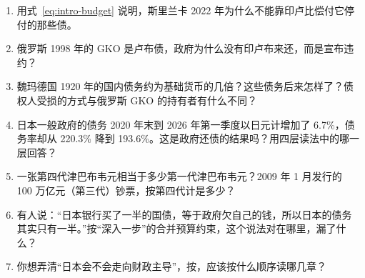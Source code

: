 \begin{selfcheck}
\begin{enumerate}
\item 用式~\eqref{eq:intro-budget} 说明，斯里兰卡 2022 年为什么不能靠印卢比偿付它停付的那些债。
\item 俄罗斯 1998 年的 GKO 是卢布债，政府为什么没有印卢布来还，而是宣布违约？
\item 魏玛德国 1920 年的国内债务约为基础货币的几倍？这些债务后来怎样了？债权人受损的方式与俄罗斯 GKO 的持有者有什么不同？
\item 日本一般政府的债务 2020 年末到 2026 年第一季度以日元计增加了 6.7\%，债务率却从 220.3\% 降到 193.6\%。这是政府还债的结果吗？用四层读法中的哪一层回答？
\item 一张第四代津巴布韦元相当于多少第一代津巴布韦元？2009 年 1 月发行的 100 万亿元（第三代）钞票，按第四代计是多少？
\item 有人说：“日本银行买了一半的国债，等于政府欠自己的钱，所以日本的债务其实只有一半。”按“深入一步”的合并预算约束，这个说法对在哪里，漏了什么？
\item 你想弄清“日本会不会走向财政主导”，按，应该按什么顺序读哪几章？
\end{enumerate}
\end{selfcheck}

